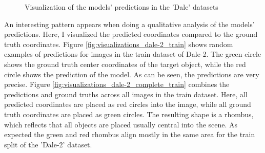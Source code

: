 \begin{figure}[h]
    \centering
    \caption{Visualization of the models' predictions in the 'Dale' datasets}
    \label{fig:visualizations_dale}
\end{figure}

An interesting pattern appears when doing a qualitative analysis of the models' predictions.
Here, I visualized the predicted coordinates compared to the ground truth coordinates.
Figure \ref{fig:visualizations_dale-2_train} shows random examples of predictions for images in the train dataset of Dale-2.
The green circle shows the ground truth center coordinates of the target object, while the red circle shows the prediction of the model.
As can be seen, the predictions are very precise.
Figure \ref{fig:visualizations_dale-2_complete_train} combines the predictions and ground truths across all images in the train dataset.
Here, all predicted coordinates are placed as red circles into the image, while all ground truth coordinates are placed as green circles.
The resulting shape is a rhombus, which reflects that all objects are placed usually central into the scene.
As expected the green and red rhombus align mostly in the same area for the train split of the 'Dale-2' dataset.

